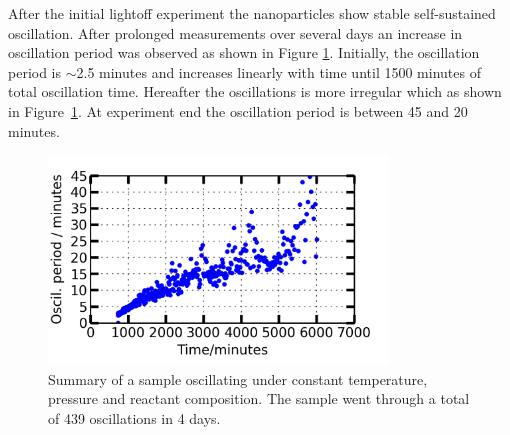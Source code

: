 \documentclass[8.5pt,twoside,twocolumn]{article}
\begin{document}
After the initial lightoff experiment the nanoparticles show stable self-sustained oscillation. After prolonged measurements over several days an increase in oscillation period was observed as shown in Figure \ref{fgr:long_measurement}. Initially, the oscillation period is $\sim$2.5 minutes and increases linearly with time until 1500 minutes of total oscillation time. Hereafter the oscillations is more irregular which as shown in Figure~\ref{fgr:long_measurement}. At experiment end the oscillation period is between 45 and 20 minutes.
\begin{figure}[h]
\centering
  \includegraphics[width=9cm]{summary_of_long_measurement.png}
  \caption{Summary of a sample oscillating under constant temperature, pressure and reactant composition. The sample went through a total of 439 oscillations in 4 days.}
  \label{fgr:long_measurement}
\end{figure}
  
\end{document}
